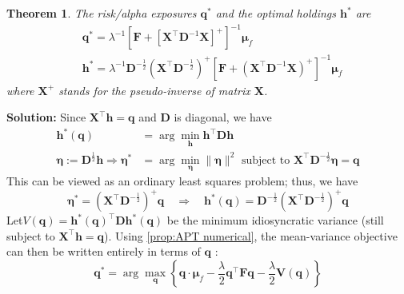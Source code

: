 \documentclass[13pt]{article}
\newtheorem{theorem}{Theorem}[section]
\theoremstyle{definition}
\newenvironment{solution}
{\color{C2}\begin{framed}\begingroup\textbf{Solution:} }
  {\endgroup\end{framed}}
\theoremstyle{remark}
\begin{document}
\begin{theorem}
    The risk/alpha exposures $\bm{q}^*$ and the optimal holdings $\bm{h}^*$ are
$$
\begin{aligned}
& \bm{q}^*=\lambda^{-1}\left[\mathbf{F}+\left[\mathbf{X}^{\top} \mathbf{D}^{-1} \mathbf{X}\right]^{+}\right]^{-1} \bm{\mu}_f \\
& \bm{h}^*=\lambda^{-1} \mathbf{D}^{-\frac{1}{2}}\left(\mathbf{X}^{\top} \mathbf{D}^{-\frac{1}{2}}\right)^{+}\left[\mathbf{F}+\left(\mathbf{X}^{\top} \mathbf{D}^{-1} \mathbf{X}\right)^{+}\right]^{-1} \bm{\mu}_f
\end{aligned}
$$
where $\mathbf{X}^+$ stands for the pseudo-inverse of matrix $\mathbf{X}$.
\end{theorem}
\begin{solution}
Since $\mathbf{X}^{\top} \bm{h}=\bm{q}$ and $\mathbf{D}$ is diagonal, we have
\begin{align*}
\bm{h}^*(\bm{q})
&=\arg \min_{\bm{h}} \bm{h}^{\top} \mathbf{D} \bm{h}\\
\bm{\eta}:=\mathbf{D}^{\frac{1}{2}} \bm{h} \Longrightarrow \bm{\eta}^*&=\arg\min_{\bm{\eta}}\|\bm{\eta}\|^2 \text { subject to } \mathbf{X}^{\top} \mathbf{D}^{-\frac{1}{2}} \bm{\eta}=\bm{q}
\end{align*}
This can be viewed as an ordinary least squares problem; thus, we have
$$
\bm{\eta}^*=\left(\mathbf{X}^{\top} \mathbf{D}^{-\frac{1}{2}}\right)^{+} \bm{q} \quad \Longrightarrow \quad \bm{h}^*(\bm{q})=\mathbf{D}^{-\frac{1}{2}}\left(\mathbf{X}^{\top} \mathbf{D}^{-\frac{1}{2}}\right)^{+} \bm{q}
$$
Let$
V(\bm{q})=\bm{h}^*(\bm{q})^{\top} \mathbf{D} \bm{h}^*(\bm{q})
$
be the minimum idiosyncratic variance (still subject to $\mathbf{X}^{\top} \bm{h}=\bm{q}$). Using \cref{prop:APT numerical}, the mean-variance objective can then be written entirely in terms of $\bm{q}$ :
$$
\bm{q}^* = \arg\max_{\bm{q}}\left\{\bm{q} \cdot \bm{\mu}_f-\frac{\lambda}{2}  \bm{q}^{\top} \mathbf{F} \bm{q}-\frac{\lambda}{2} \mathbf{V}(\bm{q})\right\}
$$ 


\end{solution}
\end{document}

